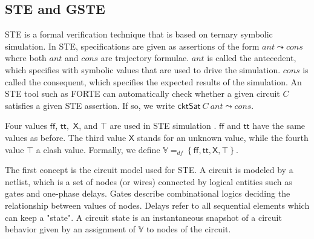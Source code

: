 \documentclass[final]{IEEEtran}
\begin{document}
 \subsection{STE and GSTE}
 STE  is a formal verification technique that is based on ternary
 symbolic simulation. In STE, specifications are given as  assertions
 of the form $ant\leadsto cons$ where both $ant$ and $cons$ are
 trajectory formulae. $ant$ is called the antecedent, which specifies
 with symbolic values that are used to drive the simulation. $cons$
 is called the consequent, which specifies the expected results of
 the
 simulation. %
 An STE tool such as FORTE can automatically check whether a given
 circuit $C$ satisfies a given STE assertion. If so, we write
 $\mathsf{cktSat}\ C\ ant\leadsto cons$.



 Four values $\mathsf{ff}$, $\mathsf{tt},$ $\mathsf{X}$, and
 $\mathsf{\top }$ are used in STE simulation
 \cite{CarFmBySymEvaOfPartTraj}. $\mathsf{ff}$ and
 $\mathsf{tt}$ have the same values as before. The third value
 $\mathsf{X}$ stands for an unknown value, while the fourth value
 $\top $ a
 clash value. Formally, we define $\mathbb{V}$$=_{df}\left\{ \mathsf{ff},%
 \mathsf{tt},\mathsf{X},\mathsf{\top }\right\} $.

 The first concept is the circuit model used for STE.  A circuit is
 modeled by a netlist, which is a set of nodes (or wires) connected
 by logical entities such as gates and one-phase delays. Gates
 describe combinational logics deciding the relationship between
 values of nodes. Delays refer to all sequential elements which can
 keep a "state". A  circuit state is an instantaneous snapshot of a
 circuit behavior  given by an  assignment of $\mathbb{V}$ to nodes
 of the circuit.

\end{document}
